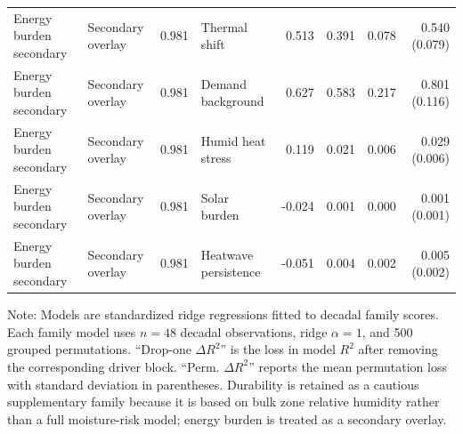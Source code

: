 \begin{table}[t]
\begin{threeparttable}
\begin{tabular}{llrlrrrr}
\addlinespace
Energy burden secondary & Secondary overlay & 0.981 & Thermal shift & 0.513 & 0.391 & 0.078 & 0.540 (0.079) \\
Energy burden secondary & Secondary overlay & 0.981 & Demand background & 0.627 & 0.583 & 0.217 & 0.801 (0.116) \\
Energy burden secondary & Secondary overlay & 0.981 & Humid heat stress & 0.119 & 0.021 & 0.006 & 0.029 (0.006) \\
Energy burden secondary & Secondary overlay & 0.981 & Solar burden & -0.024 & 0.001 & 0.000 & 0.001 (0.001) \\
Energy burden secondary & Secondary overlay & 0.981 & Heatwave persistence & -0.051 & 0.004 & 0.002 & 0.005 (0.002) \\
\bottomrule
\end{tabular}
\begin{tablenotes}
\footnotesize
\item Note: Models are standardized ridge regressions fitted to decadal family scores. Each family model uses $n=48$ decadal observations, ridge $\alpha=1$, and 500 grouped permutations. ``Drop-one $\Delta R^2$'' is the loss in model $R^2$ after removing the corresponding driver block. ``Perm. $\Delta R^2$'' reports the mean permutation loss with standard deviation in parentheses. Durability is retained as a cautious supplementary family because it is based on bulk zone relative humidity rather than a full moisture-risk model; energy burden is treated as a secondary overlay.
\end{tablenotes}
\end{threeparttable}
\end{table}
